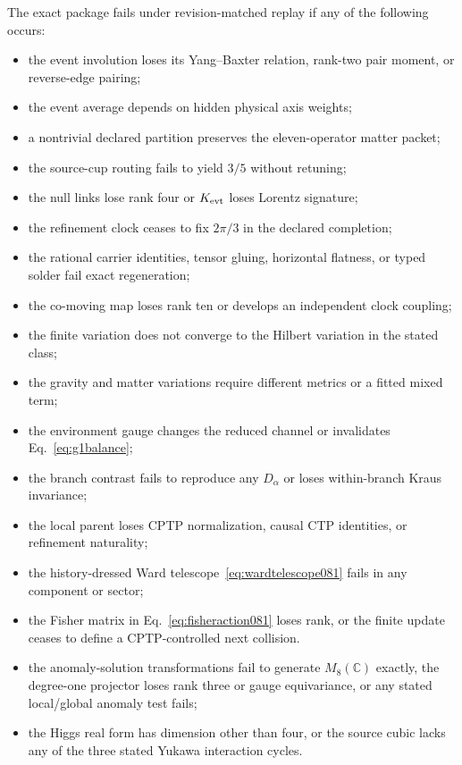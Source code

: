 \documentclass[11pt]{article}
\theoremstyle{definition}
\theoremstyle{remark}
\begin{document}
The exact package fails under revision-matched replay if any of the following occurs:
\begin{itemize}
\item the event involution loses its Yang--Baxter relation, rank-two pair moment, or reverse-edge pairing;
\item the event average depends on hidden physical axis weights;
\item a nontrivial declared partition preserves the eleven-operator matter packet;
\item the source-cup routing fails to yield $3/5$ without retuning;
\item the null links lose rank four or $K_{\rm evt}$ loses Lorentz signature;
\item the refinement clock ceases to fix $2\pi/3$ in the declared completion;
\item the rational carrier identities, tensor gluing, horizontal flatness, or typed solder fail exact regeneration;
\item the co-moving map loses rank ten or develops an independent clock coupling;
\item the finite variation does not converge to the Hilbert variation in the stated class;
\item the gravity and matter variations require different metrics or a fitted mixed term;
\item the environment gauge changes the reduced channel or invalidates Eq.~\eqref{eq:g1balance};
\item the branch contrast fails to reproduce any $D_\alpha$ or loses within-branch Kraus invariance;
\item the local parent loses CPTP normalization, causal CTP identities, or refinement naturality;
\item the history-dressed Ward telescope~\eqref{eq:wardtelescope081} fails in any component or sector;
\item the Fisher matrix in Eq.~\eqref{eq:fisheraction081} loses rank, or the finite update ceases to define a CPTP-controlled next collision.
\item the anomaly-solution transformations fail to generate $M_8(\mathbb C)$ exactly, the degree-one projector loses rank three or gauge equivariance, or any stated local/global anomaly test fails;
\item the Higgs real form has dimension other than four, or the source cubic lacks any of the three stated Yukawa interaction cycles.
\end{itemize}
\end{document}
